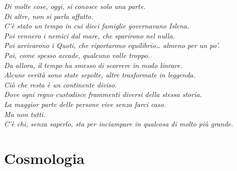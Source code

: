 \documentclass[10pt, a4paper]{report}
\newcommand{\partimagefile}{}
\newcommand{\partimage}[1]{%
	\renewcommand{\partimagefile}{#1}%
}
\begin{document}
\vfil
\hfil
\begin{minipage}{10cm}
	\begin{center}
		\textit{Di molte cose, oggi, si conosce solo una parte.\\
			Di altre, non si parla affatto.\\
			C’è stato un tempo in cui dieci famiglie governavano Islena.\\
			Poi vennero i nemici dal mare, che sparirono nel nulla.\\
			Poi arrivarono i Quoti, che riportarono equilibrio… almeno per un po’.\\
			Poi, come spesso accade, qualcuno volle troppo.\\
			Da allora, il tempo ha smesso di scorrere in modo lineare.\\
			Alcune verità sono state sepolte, altre trasformate in leggenda.\\
			Ciò che resta è un continente diviso.\\
			Dove ogni regno custodisce frammenti diversi della stessa storia.\\
			La maggior parte delle persone vive senza farci caso.\\
			Ma non tutti.\\
			C’è chi, senza saperlo, sta per inciampare in qualcosa di molto più grande.}
	\end{center}
\end{minipage}

\hfill

\partimage{cosmpart1.png}
\part{Cosmologia}
\end{document}
